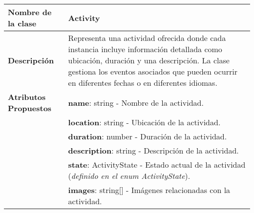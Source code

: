 \begin{clases}
	\centering
\begin{tabular}{|>{\raggedright\arraybackslash}p{4cm}|p{12cm}|}
		\hline
		\textbf{Nombre de la clase}   & \textbf{Activity}                                                                                                                                                                                                                         \\
		\hline
		\textbf{Descripción}          & Representa una actividad ofrecida donde cada instancia incluye información detallada como ubicación, duración y una descripción. La clase gestiona los eventos asociados que pueden ocurrir en diferentes fechas o en diferentes idiomas. \\
		\hline
		\textbf{Atributos Propuestos} & \textbf{name}: string - Nombre de la actividad.                                                                                                                                                                                           \\
		                              & \textbf{location}: string - Ubicación de la actividad.                                                                                                                                                                                    \\
		                              & \textbf{duration}: number - Duración de la actividad.                                                                                                                                                                                     \\
		                              & \textbf{description}: string - Descripción de la actividad.                                                                                                                                                                               \\
		                              & \textbf{state}: ActivityState - Estado actual de la actividad (\textit{definido en el enum ActivityState}).                                                                                                                               \\
		                              & \textbf{images}: string[] - Imágenes relacionadas con la actividad.                                                                                                                                                                       \\

\end{tabular}
\end{clases}
